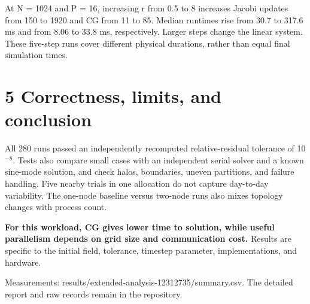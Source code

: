 \documentclass[11pt]{article}
\begin{document}
At N = 1024 and P = 16, increasing r from 0.5 to 8 increases Jacobi updates from 150 to 1920 and CG from 11 to 85. Median runtimes rise from 30.7 to 317.6 ms and from 8.06 to 33.8 ms, respectively. Larger steps change the linear system. These five-step runs cover different physical durations, rather than equal final simulation times.

\section*{5 Correctness, limits, and conclusion}

All 280 runs passed an independently recomputed relative-residual tolerance of 10$^{-8}$. Tests also compare small cases with an independent serial solver and a known sine-mode solution, and check halos, boundaries, uneven partitions, and failure handling. Five nearby trials in one allocation do not capture day-to-day variability. The one-node baseline versus two-node runs also mixes topology changes with process count.

\textbf{For this workload, CG gives lower time to solution, while useful parallelism depends on grid size and communication cost.} Results are specific to the initial field, tolerance, timestep parameter, implementations, and hardware.

{\small Measurements: results/extended-analysis-12312735/summary.csv. The detailed report and raw records remain in the repository.}
\end{document}
